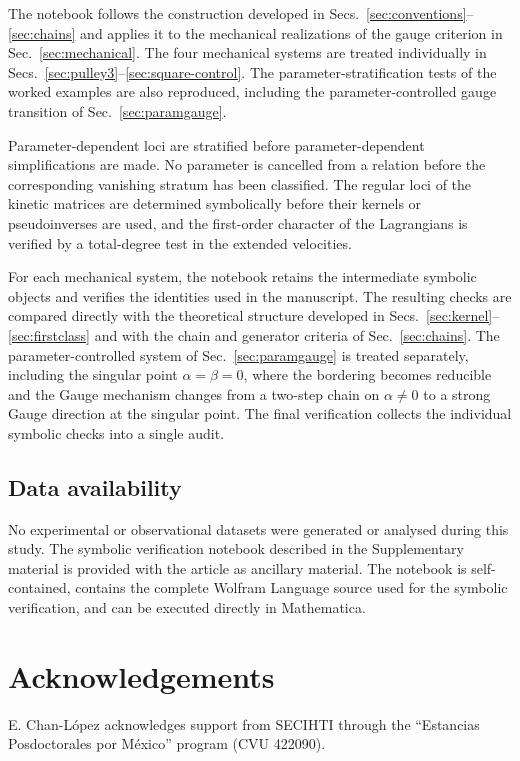 \documentclass[12pt]{article}
\theoremstyle{plain}
\theoremstyle{definition}
\theoremstyle{remark}
\begin{document}
	The notebook follows the construction developed in
	Secs.~\ref{sec:conventions}--\ref{sec:chains} and applies it to the mechanical
	realizations of the gauge criterion in Sec.~\ref{sec:mechanical}. The four
	mechanical systems are treated individually in
	Secs.~\ref{sec:pulley3}--\ref{sec:square-control}. The parameter-stratification
	tests of the worked examples are also reproduced, including the
	parameter-controlled gauge transition of Sec.~\ref{sec:paramgauge}.
	
	Parameter-dependent loci are stratified before parameter-dependent
	simplifications are made. No parameter is cancelled from a relation before
	the corresponding vanishing stratum has been classified. The regular loci of
	the kinetic matrices are determined symbolically before their kernels or
	pseudoinverses are used, and the first-order character of the Lagrangians is
	verified by a total-degree test in the extended velocities.
	
	For each mechanical system, the notebook retains the intermediate symbolic
	objects and verifies the identities used in the manuscript. The resulting
	checks are compared directly with the theoretical structure developed in
	Secs.~\ref{sec:kernel}--\ref{sec:firstclass} and with the chain and generator
	criteria of Sec.~\ref{sec:chains}. The parameter-controlled system of
	Sec.~\ref{sec:paramgauge} is treated separately, including the singular point
	$\alpha=\beta=0$, where the bordering becomes reducible and the Gauge
	mechanism changes from a two-step chain on $\alpha\neq0$ to a strong Gauge
	direction at the singular point. The final verification collects the
	individual symbolic checks into a single audit.
	
	\subsection*{Data availability}
	
	No experimental or observational datasets were generated or analysed during
	this study. The symbolic verification notebook described in the Supplementary
	material is provided with the article as ancillary material. The notebook is
	self-contained, contains the complete Wolfram Language source used for the
	symbolic verification, and can be executed directly in Mathematica.
	
	\section*{Acknowledgements}
	E. Chan-L\'opez acknowledges support from SECIHTI through the
	``Estancias Posdoctorales por M\'exico'' program (CVU 422090).
	
\end{document}
